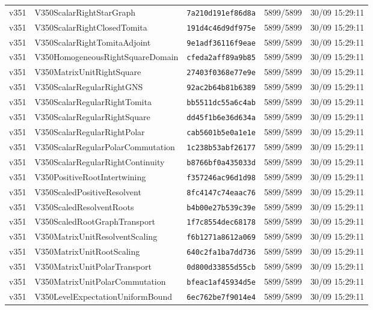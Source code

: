 \documentclass[11pt]{article}
\theoremstyle{definition}\newtheorem{deriv}{Derivação}
\begin{document}
{\begin{longtable}{@{}lllll@{}}
v351 & V350ScalarRightStarGraph & \texttt{7a210d191ef86d8a} & 5899/5899 & 30/09 15:29:11 \\
v351 & V350ScalarRightClosedTomita & \texttt{191d4c46d9df975e} & 5899/5899 & 30/09 15:29:11 \\
v351 & V350ScalarRightTomitaAdjoint & \texttt{9e1adf36116f9eae} & 5899/5899 & 30/09 15:29:11 \\
v351 & V350HomogeneousRightSquareDomain & \texttt{cfeda2aff89a9b85} & 5899/5899 & 30/09 15:29:11 \\
v351 & V350MatrixUnitRightSquare & \texttt{27403f0368e77e9e} & 5899/5899 & 30/09 15:29:11 \\
v351 & V350ScalarRegularRightGNS & \texttt{92ac2b64b81b6389} & 5899/5899 & 30/09 15:29:11 \\
v351 & V350ScalarRegularRightTomita & \texttt{bb5511dc55a6c4ab} & 5899/5899 & 30/09 15:29:11 \\
v351 & V350ScalarRegularRightSquare & \texttt{dd45f1b6e36d634a} & 5899/5899 & 30/09 15:29:11 \\
v351 & V350ScalarRegularRightPolar & \texttt{cab5601b5e0a1e1e} & 5899/5899 & 30/09 15:29:11 \\
v351 & V350ScalarRegularPolarCommutation & \texttt{1c238b53abf26177} & 5899/5899 & 30/09 15:29:11 \\
v351 & V350ScalarRegularRightContinuity & \texttt{b8766bf0a435033d} & 5899/5899 & 30/09 15:29:11 \\
v351 & V350PositiveRootIntertwining & \texttt{f357246ac96d1d98} & 5899/5899 & 30/09 15:29:11 \\
v351 & V350ScaledPositiveResolvent & \texttt{8fc4147c74eaac76} & 5899/5899 & 30/09 15:29:11 \\
v351 & V350ScaledResolventRoots & \texttt{b4b00e27b539c39e} & 5899/5899 & 30/09 15:29:11 \\
v351 & V350ScaledRootGraphTransport & \texttt{1f7c8554dec68178} & 5899/5899 & 30/09 15:29:11 \\
v351 & V350MatrixUnitResolventScaling & \texttt{f6b1271a8612a069} & 5899/5899 & 30/09 15:29:11 \\
v351 & V350MatrixUnitRootScaling & \texttt{640c2fa1ba7dd736} & 5899/5899 & 30/09 15:29:11 \\
v351 & V350MatrixUnitPolarTransport & \texttt{0d800d33855d55cb} & 5899/5899 & 30/09 15:29:11 \\
v351 & V350MatrixUnitPolarCommutation & \texttt{bfeac1af45934d5e} & 5899/5899 & 30/09 15:29:11 \\
v351 & V350LevelExpectationUniformBound & \texttt{6ec762be7f9014e4} & 5899/5899 & 30/09 15:29:11 \\

\end{longtable}}
\end{document}
